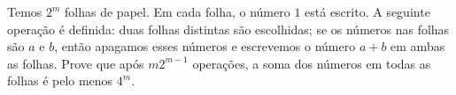 Temos $2^m$ folhas de papel. Em cada folha, o número $1$ está escrito.  A seguinte operação é definida: duas folhas distintas são escolhidas; se os números nas folhas são $a$ e $b$,  então apagamos esses números e escrevemos o número $a + b$ em ambas as folhas. Prove que após $m2^{m -1}$ operações, a soma dos números em todas as folhas é pelo menos $4^m$.  
